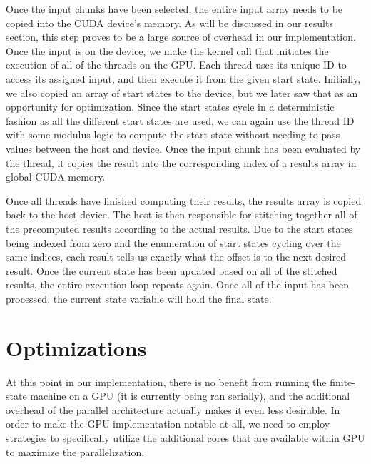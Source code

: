 \documentclass[11pt]{sigplanconf}
\begin{document}
Once the input chunks have been selected, the entire input array needs to be copied into the CUDA device's memory. As will be discussed in our results section, this step proves to be a large source of overhead in our implementation. Once the input is on the device, we make the kernel call that initiates the execution of all of the threads on the GPU. Each thread uses its unique ID to access its assigned input, and then execute it from the given start state. Initially, we also copied an array of start states to the device, but we later saw that as an opportunity for optimization. Since the start states cycle in a deterministic fashion as all the different start states are used, we can again use the thread ID with some modulus logic to compute the start state without needing to pass values between the host and device. Once the input chunk has been evaluated by the thread, it copies the result into the corresponding index of a results array in global CUDA memory.

Once all threads have finished computing their results, the results array is copied back to the host device. The host is then responsible for stitching together all of the precomputed results according to the actual results. Due to the start states being indexed from zero and the enumeration of start states cycling over the same indices, each result tells us exactly what the offset is to the next desired result. Once the current state has been updated based on all of the stitched results, the entire execution loop repeats again. Once all of the input has been processed, the current state variable will hold the final state.

\section{Optimizations}

At this point in our implementation, there is no benefit from running the finite-state machine on a GPU (it is currently being ran serially), and the additional overhead of the parallel architecture actually makes it even less desirable. In order to make the GPU implementation notable at all, we need to employ strategies to specifically utilize the additional cores that are available within GPU to maximize the parallelization. 
\end{document}
